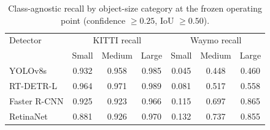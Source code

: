 \begin{table}[t]
    \centering
    \caption{Class-agnostic recall by object-size category at the frozen operating point (confidence $\geq 0.25$, IoU $\geq 0.50$).}
    \label{tab:object_size_recall}
    \begin{tabular}{lcccccc}
        \toprule
        Detector & \multicolumn{3}{c}{KITTI recall} & \multicolumn{3}{c}{Waymo recall} \\
        & Small & Medium & Large & Small & Medium & Large \\
        \midrule
        YOLOv8s & 0.932 & 0.958 & 0.985 & 0.045 & 0.448 & 0.460 \\
        RT-DETR-L & 0.964 & 0.971 & 0.989 & 0.081 & 0.517 & 0.558 \\
        Faster R-CNN & 0.925 & 0.923 & 0.966 & 0.115 & 0.697 & 0.865 \\
        RetinaNet & 0.881 & 0.926 & 0.970 & 0.132 & 0.737 & 0.855 \\
        \bottomrule
    \end{tabular}
\end{table}
